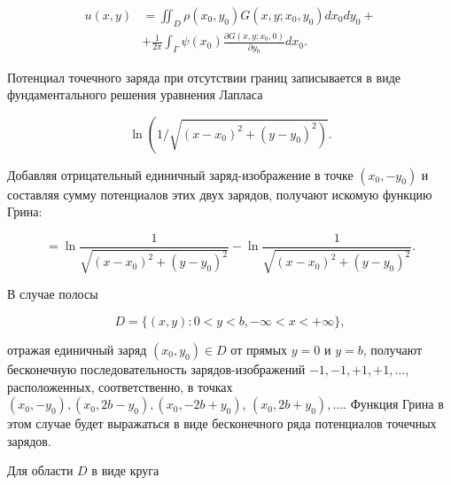 \documentclass[10pt]{article}
\begin{document}
\[

\begin{aligned}

u(x, y) & =\iint_{D} \rho\left(x_{0}, y_{0}\right) G\left(x, y ; x_{0}, y_{0}\right) d x_{0} d y_{0}+ \\

& +\frac{1}{2 \pi} \int_{\Gamma} \psi\left(x_{0}\right) \frac{\partial G\left(x, y ; x_{0}, 0\right)}{\partial y_{0}} d x_{0} .

\end{aligned}

\]



Потенциал точечного заряда при отсутствии границ записывается в виде фундаментального решения уравнения Лапласа



\[

\ln \left(1 / \sqrt{\left.\left(x-x_{0}\right)^{2}+\left(y-y_{0}\right)^{2}\right)} .\right.

\]



Добавляя отрицательный единичный заряд-изображение в точке $\left(x_{0},-y_{0}\right)$ и составляя сумму потенциалов этих двух зарядов, получают искомую функцию Грина:



\[

=\ln \frac{1}{\sqrt{\left(x-x_{0}\right)^{2}+\left(y-y_{0}\right)^{2}}}-\ln \frac{1}{\sqrt{\left(x-x_{0}\right)^{2}+\left(y-y_{0}\right)^{2}}} .

\]



В случае полосы



\[

D=\{(x, y): 0<y<b,-\infty<x<+\infty\},

\]



отражая единичный заряд $\left(x_{0}, y_{0}\right) \in D$ от прямых $y=0$ и $y=b$, получают бесконечную последовательность зарядов-изображений $-1,-1,+1,+1, \ldots$, расположенных, соответственно, в точках $\left(x_{0},-y_{0}\right),\left(x_{0}, 2 b-y_{0}\right),\left(x_{0},-2 b+y_{0}\right)$, $\left(x_{0}, 2 b+y_{0}\right), \ldots$. Функция Грина в этом случае будет выражаться в виде бесконечного ряда потенциалов точечных зарядов.



Для области $D$ в виде круга
\end{document}

